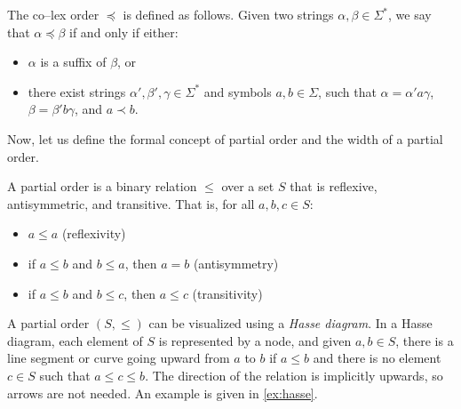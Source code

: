 \begin{definition} 
    The co--lex order $\preceq$ is defined as follows. Given two strings $\alpha, \beta \in \Sigma^*$, we say that $\alpha \preceq \beta$ if and only if either:
    \begin{itemize}
        \item $\alpha$ is a suffix of $\beta$, or
        \item there exist strings $\alpha', \beta', \gamma \in \Sigma^*$ and symbols $a, b \in \Sigma$, such that $\alpha = \alpha'a\gamma$, $\beta = \beta'b\gamma$, and $a \prec b$.
    \end{itemize}
\end{definition}

Now, let us define the formal concept of partial order and the width of a partial order. 
\begin{definition}
    A partial order is a binary relation $\leq$ over a set $S$ that is reflexive, antisymmetric, and transitive. That is, for all $a, b, c \in S$:
    \begin{itemize}
        \item $a \leq a$ (reflexivity)
        \item if $a \leq b$ and $b \leq a$, then $a = b$ (antisymmetry)
        \item if $a \leq b$ and $b \leq c$, then $a \leq c$ (transitivity)
    \end{itemize}
\end{definition}

A partial order $(S, \leq)$ can be visualized using a \textit{Hasse diagram}. In a Hasse diagram, each element of $S$ is represented by a node, and given $a,b \in S$, there is a line segment or curve going upward from $a$ to $b$ if $a \leq b$ and there is no element $c\in S$ such that $a \leq c \leq b$. The direction of the relation is implicitly upwards, so arrows are not needed. An example is given in \cref{ex:hasse}.


